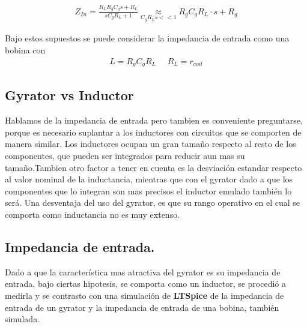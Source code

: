 \documentclass[a4paper]{article}
\begin{document}
\begin{align}Z_{In}=\frac{R_LR_gC_gs+R_L}{sC_gR_L+1}\underset{C_gR_Ls << 1}{\approx}R_gC_gR_L \cdot s + R_g 
\label{eq:Zintrans}
\end{align}

Bajo estos supuestos se puede considerar la impedancia de entrada como una bobina con 
\begin{align}  L=R_gC_gR_L  \ \ \ \ \ \  R_L=r_{coil} \label{eq:basicL1}\end{align}
\flushleft
\subsection{Gyrator vs Inductor}
Hablamos de la impedancia de entrada pero tambien es conveniente preguntarse, porque es necesario suplantar a los inductores con circuitos que se comporten de manera similar.
Los inductores ocupan un gran tamaño respecto al resto de los componentes, que pueden ser integrados para reducir aun mas su tamaño.Tambien otro factor a tener en cuenta es la desviación estandar respecto al valor nominal de la inductancia, mientras que con el gyrator dado a que los componentes que lo integran son mas precisos el inductor emulado también lo será. Una desventaja del uso del gyrator, es que su rango operativo en el cual se comporta como inductancia no es muy extenso.

\subsection{Impedancia de entrada.}
\label{section:zin}
Dado a que la característica mas atractiva del gyrator es  su impedancia de entrada, bajo ciertas hipotesis, se comporta como un inductor, se procedió a medirla y se contrasto con una simulación de \textbf{LTSpice} de la impedancia de entrada de un gyrator y la impedancia de entrada de una bobina, también simulada.
\end{document}
